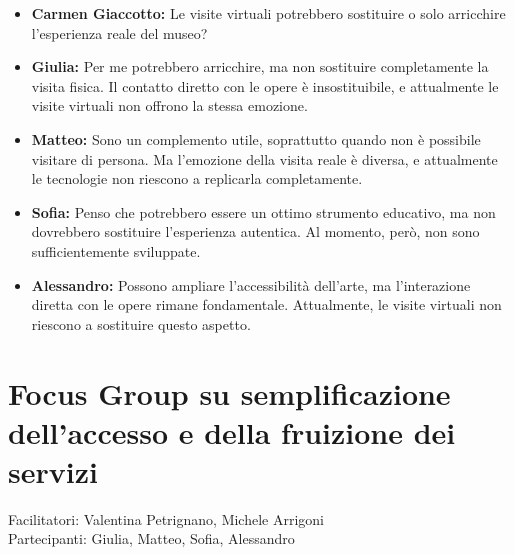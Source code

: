 \documentclass{article}
\begin{document}
\begin{itemize}
\item \textbf{Carmen Giaccotto:} Le visite virtuali potrebbero sostituire o solo arricchire l’esperienza reale del museo?

\item \textbf{Giulia:} Per me potrebbero arricchire, ma non sostituire completamente la visita fisica. Il contatto diretto con le opere è insostituibile, e attualmente le visite virtuali non offrono la stessa emozione.

\item \textbf{Matteo:} Sono un complemento utile, soprattutto quando non è possibile visitare di persona. Ma l’emozione della visita reale è diversa, e attualmente le tecnologie non riescono a replicarla completamente.

\item \textbf{Sofia:} Penso che potrebbero essere un ottimo strumento educativo, ma non dovrebbero sostituire l’esperienza autentica. Al momento, però, non sono sufficientemente sviluppate.

\item \textbf{Alessandro:} Possono ampliare l’accessibilità dell’arte, ma l’interazione diretta con le opere rimane fondamentale. Attualmente, le visite virtuali non riescono a sostituire questo aspetto.

\end{itemize}

\section{Focus Group su sempliﬁcazione dell’accesso e della fruizione dei servizi} 
Facilitatori: Valentina Petrignano, Michele Arrigoni \\
Partecipanti: Giulia, Matteo, Sofia, Alessandro
\end{document}
